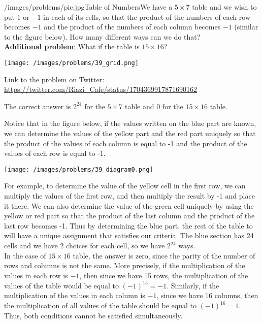 \begin{problem}{/images/problems/pic.jpg}{Table of Numbers}We have a $5 \times 7$ table and we wish to put $1$ or $-1$ in each of its cells, so that the product of the numbers of each row becomes $-1$ and the product of the numbers of each column becomes $-1$ (similar to the figure below). How many different ways can we do that?\\[0.2cm]

\textbf{Additional problem}: What if the table is $15 \times 16$?

\begin{center}
	\texttt{[image: /images/problems/39\_grid.png]}
\end{center}

Link to the problem on Twitter:  \url{https://twitter.com/Riazi_Cafe/status/1704369917871690162}\end{problem}
\begin{solution}
The correct answer is $2^{24}$ for the $5 \times 7$ table and 0 for the $15 \times 16$ table.

Notice that in the figure below, if the values written on the blue part are known, we can determine the values of the yellow part and the red part uniquely so that the product of the values of each column is equal to -1 and the product of the values of each row is equal to -1.

\begin{center}
	\texttt{[image: /images/problems/39\_diagram0.png]}
\end{center}


For example, to determine the value of the yellow cell in the first row, we can multiply the values of the first row, and then multiply the result by -1 and place it there.
We can also determine the value of the green cell uniquely by using the yellow or red part so that the product of the last column and the product of the last row becomes -1. Thus by determining the blue part, the rest of the table to will have a unique assignment that satisfies our criteria. The blue section has 24 cells and we have 2 choices for each cell, so we have $2^{24}$ ways.\\[0.2cm]



In the case of  $15 \times 16$ table, the answer is zero, since the parity of the number of rows and columns is not the same. More precisely, if the multiplication of the values in each row is $-1$, then since we have 15 rows, the multiplication of the values of the table would be equal to $(-1)^{15} = -1$. Similarly, if the multiplication of the values in each column is $-1$, since we have 16 columns, then the multiplication of all values of the table should be equal to $(-1)^{16} = 1$. Thus, both conditions cannot be satisfied simultaneously.


\end{solution}
